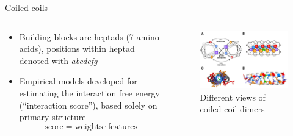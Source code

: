 \documentclass{beamer}
\theoremstyle{plain}
\theoremstyle{remark}
\begin{document}
\begin{frame}{Coiled coils}
	\begin{columns}[T] %
		\begin{column}{.48\textwidth}
				\begin{itemize}
				\item Building blocks are heptads (7 amino acids), positions within heptad denoted with \emph{abcdefg}
				\item Empirical models developed for estimating the interaction free energy (``interaction score''), based solely on primary structure \cite{fong2004predicting, potapov2015data}
				\[ \mathrm{score} = \mathrm{weights} \cdot \mathrm{features} \]
			\end{itemize}
		\end{column}%
		\hfill%
		\begin{column}{.48\textwidth}
			\begin{figure}
				\centering
				\hspace{-1.05cm}\includegraphics[width=1.2\linewidth]{figures/bCIPA_cc_complete}
				\caption{Different views of coiled-coil dimers}
			\end{figure}
		\end{column}%
	\end{columns}
	
\end{frame}
\end{document}
